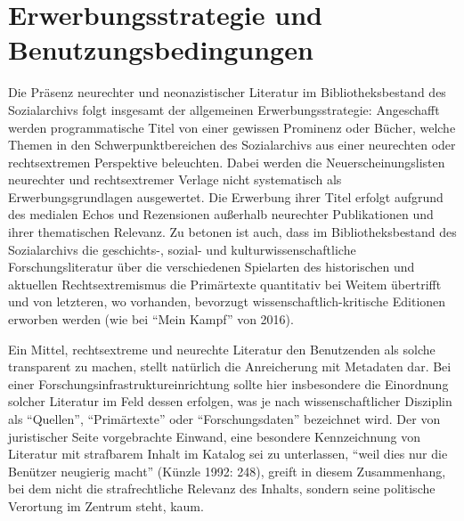 \documentclass[a4paper,
fontsize=11pt,
oneside,
numbers=noperiodatend,
parskip=half-,
bibliography=totoc,
final
]{scrartcl}
\begin{document}
\hypertarget{erwerbungsstrategie-und-benutzungsbedingungen}{%
\section{Erwerbungsstrategie und
Benutzungsbedingungen}\label{erwerbungsstrategie-und-benutzungsbedingungen}}

Die Präsenz neurechter und neonazistischer Literatur im
Bibliotheksbestand des Sozialarchivs folgt insgesamt der allgemeinen
Erwerbungsstrategie: Angeschafft werden programmatische Titel von einer
gewissen Prominenz oder Bücher, welche Themen in den
Schwerpunktbereichen des Sozialarchivs aus einer neurechten oder
rechtsextremen Perspektive beleuchten. Dabei werden die
Neuerscheinungslisten neurechter und rechtsextremer Verlage nicht
systematisch als Erwerbungsgrundlagen ausgewertet. Die Erwerbung ihrer
Titel erfolgt aufgrund des medialen Echos und Rezensionen außerhalb
neurechter Publikationen und ihrer thematischen Relevanz. Zu betonen ist
auch, dass im Bibliotheksbestand des Sozialarchivs die geschichts-,
sozial- und kulturwissenschaftliche Forschungsliteratur über die
verschiedenen Spielarten des historischen und aktuellen
Rechtsextremismus die Primärtexte quantitativ bei Weitem übertrifft und
von letzteren, wo vorhanden, bevorzugt wissenschaftlich-kritische
Editionen erworben werden (wie bei \enquote{Mein Kampf} von 2016).

Ein Mittel, rechtsextreme und neurechte Literatur den Benutzenden als
solche transparent zu machen, stellt natürlich die Anreicherung mit
Metadaten dar. Bei einer Forschungsinfrastruktureinrichtung sollte hier
insbesondere die Einordnung solcher Literatur im Feld dessen erfolgen,
was je nach wissenschaftlicher Disziplin als \enquote{Quellen},
\enquote{Primärtexte} oder \enquote{Forschungsdaten} bezeichnet wird.
Der von juristischer Seite vorgebrachte Einwand, eine besondere
Kennzeichnung von Literatur mit strafbarem Inhalt im Katalog sei zu
unterlassen, \enquote{weil dies nur die Benützer neugierig macht}
(Künzle 1992: 248), greift in diesem Zusammenhang, bei dem nicht die
strafrechtliche Relevanz des Inhalts, sondern seine politische Verortung
im Zentrum steht, kaum.
\end{document}
